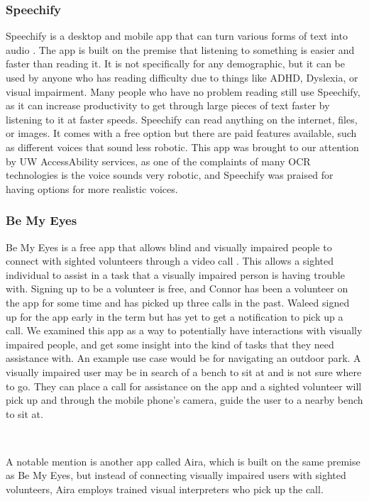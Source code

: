\documentclass[a4paper,11pt]{article}
\begin{document}
\subsubsection{Speechify}
Speechify is a desktop and mobile app that can turn various forms of text into audio \cite{speechify}. The app is built on the premise that listening to something is easier and faster than reading it. It is not specifically for any demographic, but it can be used by anyone who has reading difficulty due to things like ADHD, Dyslexia, or visual impairment. Many people who have no problem reading still use Speechify, as it can increase productivity to get through large pieces of text faster by listening to it at faster speeds. Speechify can read anything on the internet, files, or images. It comes with a free option but there are paid features available, such as different voices that sound less robotic. This app was brought to our attention by UW AccessAbility services, as one of the complaints of many OCR technologies is the voice sounds very robotic, and Speechify was praised for having options for more realistic voices.

\newpage
\subsubsection{Be My Eyes}
Be My Eyes is a free app that allows blind and visually impaired people to connect with sighted volunteers through a video call \cite{be-my-eyes}. This allows a sighted individual to assist in a task that a visually impaired person is having trouble with. Signing up to be a volunteer is free, and Connor has been a volunteer on the app for some time and has picked up three calls in the past. Waleed signed up for the app early in the term but has yet to get a notification to pick up a call. We examined this app as a way to potentially have interactions with visually impaired people, and get some insight into the kind of tasks that they need assistance with. An example use case would be for navigating an outdoor park. A visually impaired user may be in search of a bench to sit at and is not sure where to go. They can place a call for assistance on the app and a sighted volunteer will pick up and through the mobile phone's camera, guide the user to a nearby bench to sit at.

\

\noindent
A notable mention is another app called Aira, which is built on the same premise as Be My Eyes, but instead of connecting visually impaired users with sighted volunteers, Aira employs trained visual interpreters who pick up the call.
\end{document}
